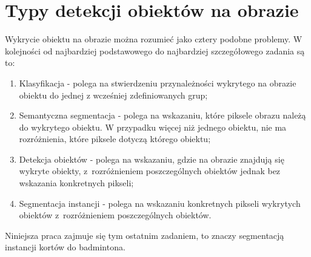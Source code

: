 \section{Typy detekcji obiektów na obrazie}
\label{sec:typy_detekcji}

Wykrycie obiektu na obrazie można rozumieć jako cztery podobne problemy.
W kolejności od najbardziej podstawowego do najbardziej szczegółowego zadania są to:

\begin{enumerate}
	\item Klasyfikacja - polega na stwierdzeniu przynależności wykrytego na obrazie obiektu do jednej z wcześniej zdefiniowanych grup;
  \item Semantyczna segmentacja - polega na wskazaniu, które piksele obrazu należą do wykrytego obiektu.
        W przypadku więcej niż jednego obiektu, nie ma rozróżnienia, które piksele dotyczą którego obiektu;
	\item Detekcja obiektów - polega na wskazaniu, gdzie na obrazie znajdują się wykryte obiekty, z~rozróżnieniem poszczególnych obiektów jednak bez wskazania konkretnych pikseli;
	\item Segmentacja instancji - polega na wskazaniu konkretnych pikseli wykrytych obiektów z~rozróżnieniem poszczególnych obiektów.
\end{enumerate}

Niniejsza praca zajmuje się tym ostatnim zadaniem, to znaczy segmentacją instancji kortów do badmintona.
